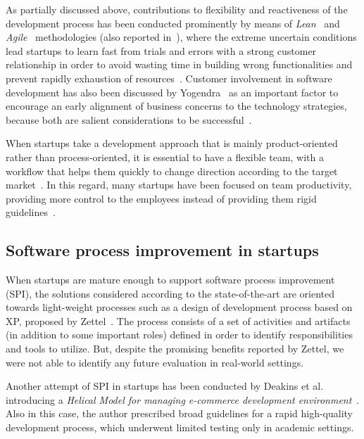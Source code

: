 \documentclass[10pt,journal,letterpaper,compsoc]{IEEEtran}
\begin{document}
As partially discussed above, contributions to flexibility and reactiveness of
the development process has been conducted prominently by means of 
\textit{Lean}~\cite{Gautam2008} and \textit{Agile}~\cite{Abrahamsson2002} 
methodologies (also reported in~\cite{Taipale2010, Kuvinka2011}), where the 
extreme uncertain conditions lead startups to learn fast from trials and errors 
with a strong customer relationship in order to avoid wasting time in building 
wrong functionalities and prevent rapidly exhaustion of 
resources~\cite{Midler2008,Hilmola2003, Sutton2000}. Customer involvement in 
software development has also been discussed by Yogendra~\cite{Yogendra2002} as 
an important factor to encourage an early alignment of business concerns to the 
technology strategies, because both are salient considerations to be 
successful~\cite{Tingling2007}.

When startups take a development approach that is mainly product-oriented
rather than process-oriented, it is essential to have a flexible team, with a
workflow that helps them quickly to change direction according to the target
market~\cite{Sutton2000}. In this regard, many startups have been focused on
team productivity, providing more control to the employees instead of providing
them rigid guidelines~\cite{Tanabian2005, Chorev2006, Kakati2003}.

\subsection{Software process improvement in startups}

When startups are mature enough to support software process improvement (SPI),
the solutions considered according to the state-of-the-art are oriented towards
light-weight processes such as a design of development process based on XP,
proposed by Zettel~\cite{Zettel2001}. The process consists of a set of
activities and artifacts (in addition to some important roles) defined in order
to identify responsibilities and tools to utilize. But, despite the promising
benefits reported by Zettel, we were not able to identify any future evaluation
in real-world settings.

Another attempt of SPI in startups has been conducted by Deakins et al.
introducing a \textit{Helical Model for managing e-commerce development
environment}~\cite{Deakins2005}. Also in this case, the author prescribed broad
guidelines for a rapid high-quality development process, which underwent limited
testing only in academic settings.
\end{document}
